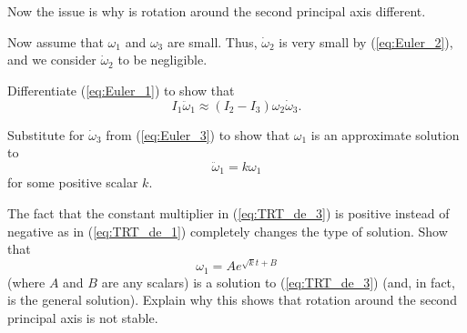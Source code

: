 Now the issue is why is rotation around the second principal axis different. 

\begin{pactivity} \label{act:TRT_axes2} Now assume that  $\omega_1$ and $\omega_3$ are small. Thus, $\dot{\omega}_2$ is very small by (\ref{eq:Euler_2}), and we consider $\dot{\omega}_2$ to be negligible. 
\ba
\item Differentiate  (\ref{eq:Euler_1}) to show that 
\[I_1 \ddot{\omega}_1 \approx (I_2-I_3)  \omega_2 \dot{\omega}_3.\]


\item Substitute for $\dot{\omega}_3$ from (\ref{eq:Euler_3}) to show that $\omega_1$ is an approximate solution to 
\begin{equation} \label{eq:TRT_de_3}
\ddot{\omega}_1 = k \omega_1
\end{equation}
for some positive scalar $k$. 

\item The fact that  the constant multiplier in (\ref{eq:TRT_de_3}) is positive instead of negative as in (\ref{eq:TRT_de_1}) completely changes the type of solution. Show that 
\begin{equation} \label{eq:TRT_de_4} 
\omega_1 = Ae^{\sqrt{k}t+B}
\end{equation}
(where $A$ and $B$ are any scalars) is a solution to (\ref{eq:TRT_de_3}) (and, in fact, is the general solution). Explain why this shows that rotation around the second principal axis is not stable. 


\ea

\end{pactivity}



